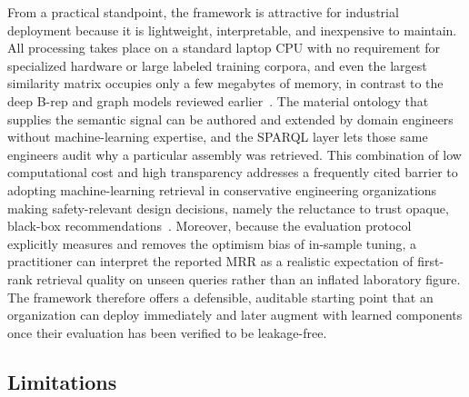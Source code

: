 \documentclass[preprint,12pt]{elsarticle}
\begin{document}
From a practical standpoint, the framework is attractive for industrial deployment because it is lightweight, interpretable, and inexpensive to maintain.
All processing takes place on a standard laptop CPU with no requirement for specialized hardware or large labeled training corpora, and even the largest similarity matrix occupies only a few megabytes of memory, in contrast to the deep B-rep and graph models reviewed earlier~\cite{Hou2023,Qin2025}.
The material ontology that supplies the semantic signal can be authored and extended by domain engineers without machine-learning expertise, and the SPARQL layer lets those same engineers audit why a particular assembly was retrieved.
This combination of low computational cost and high transparency addresses a frequently cited barrier to adopting machine-learning retrieval in conservative engineering organizations making safety-relevant design decisions, namely the reluctance to trust opaque, black-box recommendations~\cite{Rajabi2024}.
Moreover, because the evaluation protocol explicitly measures and removes the optimism bias of in-sample tuning, a practitioner can interpret the reported MRR as a realistic expectation of first-rank retrieval quality on unseen queries rather than an inflated laboratory figure.
The framework therefore offers a defensible, auditable starting point that an organization can deploy immediately and later augment with learned components once their evaluation has been verified to be leakage-free.

\subsection{Limitations}
\end{document}
